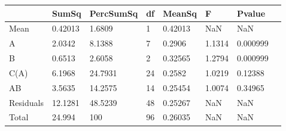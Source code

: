 \begin{table} 
\begin{tabular}{llllllll}
 & SumSq & PercSumSq & df & MeanSq & F & Pvalue \\ 
 \hline 
Mean & 0.42013 & 1.6809 & 1 & 0.42013 & NaN & NaN \\ 
A & 2.0342 & 8.1388 & 7 & 0.2906 & 1.1314 & 0.000999 \\ 
B & 0.6513 & 2.6058 & 2 & 0.32565 & 1.2794 & 0.000999 \\ 
C(A) & 6.1968 & 24.7931 & 24 & 0.2582 & 1.0219 & 0.12388 \\ 
AB & 3.5635 & 14.2575 & 14 & 0.25454 & 1.0074 & 0.34965 \\ 
Residuals & 12.1281 & 48.5239 & 48 & 0.25267 & NaN & NaN \\ 
Total & 24.994 & 100 & 96 & 0.26035 & NaN & NaN \\ 
\end{tabular} 
\end{table} 
